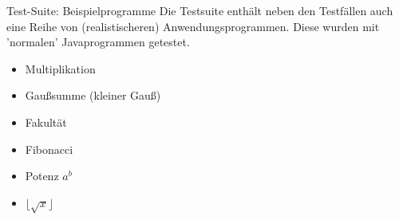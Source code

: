 \begin{frame}{Test-Suite: Beispielprogramme}
Die Testsuite enthält neben den Testfällen auch eine Reihe von (realistischeren) Anwendungsprogrammen. Diese wurden mit 'normalen' Javaprogrammen getestet.

\begin{itemize}
	\item Multiplikation
	\item Gaußsumme (kleiner Gauß)
	\item Fakultät
	\item Fibonacci
	\item Potenz $a^b$
	\item $\lfloor \sqrt{x} \rfloor$
\end{itemize}	
\end{frame}


